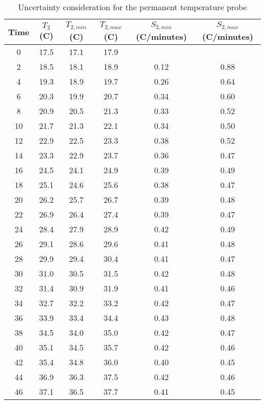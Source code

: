 \begin{table}[!htb]
    \centering
		\begin{tabular}{cccccc}
        \hline
		Time & $T_2$ (\degree C)   & $T_{2, min}$ (\degree C) & $T_{2, max}$ (\degree C) & $S_{2, min}$ (\degree C/minutes) & $S_{2, max}$ (\degree C/minutes) \\ \hline\hline
		0    & 17.5 & 17.1   & 17.9   &        &        \\
		2    & 18.5 & 18.1   & 18.9   & 0.12   & 0.88   \\
		4    & 19.3 & 18.9   & 19.7   & 0.26   & 0.64   \\
		6    & 20.3 & 19.9   & 20.7   & 0.34   & 0.60   \\
		8    & 20.9 & 20.5   & 21.3   & 0.33   & 0.52   \\
		10   & 21.7 & 21.3   & 22.1   & 0.34   & 0.50   \\
		12   & 22.9 & 22.5   & 23.3   & 0.38   & 0.52   \\
		14   & 23.3 & 22.9   & 23.7   & 0.36   & 0.47   \\
		16   & 24.5 & 24.1   & 24.9   & 0.39   & 0.49   \\
		18   & 25.1 & 24.6   & 25.6   & 0.38   & 0.47   \\
		20   & 26.2 & 25.7   & 26.7   & 0.39   & 0.48   \\
		22   & 26.9 & 26.4   & 27.4   & 0.39   & 0.47   \\
		24   & 28.4 & 27.9   & 28.9   & 0.42   & 0.49   \\
		26   & 29.1 & 28.6   & 29.6   & 0.41   & 0.48   \\
		28   & 29.9 & 29.4   & 30.4   & 0.41   & 0.47   \\
		30   & 31.0 & 30.5   & 31.5   & 0.42   & 0.48   \\
		32   & 31.4 & 30.9   & 31.9   & 0.41   & 0.46   \\
		34   & 32.7 & 32.2   & 33.2   & 0.42   & 0.47   \\
		36   & 33.9 & 33.4   & 34.4   & 0.43   & 0.48   \\
		38   & 34.5 & 34.0   & 35.0   & 0.42   & 0.47   \\
		40   & 35.1 & 34.5   & 35.7   & 0.42   & 0.46   \\
		42   & 35.4 & 34.8   & 36.0   & 0.40   & 0.45   \\
		44   & 36.9 & 36.3   & 37.5   & 0.42   & 0.46   \\
		46   & 37.1 & 36.5   & 37.7   & 0.41   & 0.45  
		\end{tabular}
        \caption{Uncertainty consideration for the permanent temperature probe}\label{tab:data_t2}
\end{table}




